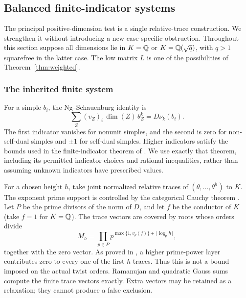 \subsection{Balanced finite-indicator systems}\label{sec:balanced}
The principal positive-dimension test is a single relative-trace
construction. We strengthen it without introducing a new case-specific
obstruction. Throughout this section suppose all dimensions lie in
$K=\mathbb Q$ or $K=\mathbb Q(\sqrt q)$, with $q>1$ squarefree in the latter case.
The low matrix $L$ is one of the possibilities of
Theorem~\ref{thm:weighted}.

\subsubsection{The inherited finite system}
For a simple $b_i$, the Ng--Schauenburg identity \cite{NS} is
\begin{equation}\label{eq:indicator}
 \sum_Z (v_Z)_i\,\dim(Z)\,\theta_Z^k=D\nu_k(b_i).
\end{equation}
The first indicator vanishes for nonunit simples, and the second is zero
for non-self-dual simples and $\pm1$ for self-dual simples. Higher
indicators satisfy the bounds used in the finite-indicator theorem of
\cite{DP5}. We use exactly that theorem, including its permitted
indicator choices and rational inequalities, rather than assuming
unknown indicators have prescribed values.

For a chosen height $h$, take joint normalized relative traces of
$(\theta,\ldots,\theta^h)$ to $K$. The exponent prime support is
controlled by the categorical Cauchy theorem \cite{BNRW}. Let $P$ be
the prime divisors of the norm of $D$, and let $f$ be the conductor of
$K$ (take $f=1$ for $K=\mathbb Q$). The trace vectors are covered by roots
whose orders divide
\begin{equation}\label{eq:orderbox}
 M_h=\prod_{p\in P}p^{\max\{1,v_p(f)\}+\lfloor\log_p h\rfloor},
\end{equation}
together with the zero vector. As proved in \cite{DP5}, a higher
prime-power layer contributes zero to every one of the first $h$
traces. Thus this is not a bound imposed on the actual twist orders.
Ramanujan and quadratic Gauss sums compute the finite trace vectors
exactly. Extra vectors may be retained as a relaxation; they cannot
produce a false exclusion.

